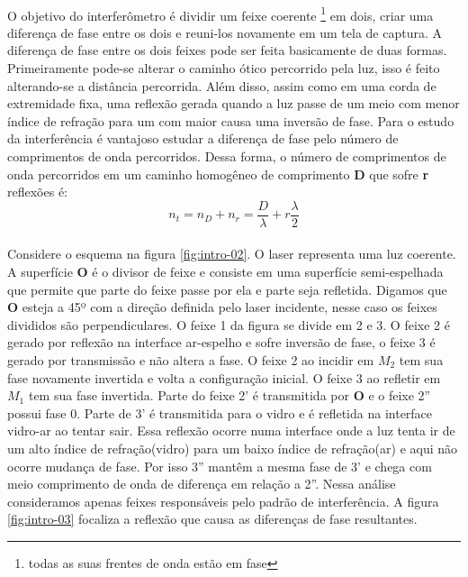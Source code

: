 \documentclass[a4paper,11pt]{article}
\begin{document}
\paragraph{}O objetivo do interferômetro é dividir um feixe coerente \footnote{todas as suas frentes de onda estão em fase} em dois, criar uma diferença de fase entre os dois e reuni-los novamente em um tela de captura. A diferença de fase entre os dois feixes pode ser feita basicamente de duas formas. Primeiramente pode-se alterar o caminho ótico percorrido pela luz, isso é feito alterando-se a distância percorrida. Além disso, assim como em uma corda de extremidade fixa, uma reflexão gerada quando a luz passe de um meio com menor índice de refração para um com maior causa uma inversão de fase. Para o estudo da interferência é vantajoso estudar a diferença de fase pelo número de comprimentos de onda percorridos. Dessa forma, o número de comprimentos de onda percorridos em um caminho homogêneo de comprimento \textbf{D} que sofre \textbf{r} reflexões é:
\begin{equation}
	n_t = n_D + n_r = \frac{D}{\lambda} +  r\frac{\lambda}{2}
\end{equation}
\paragraph{} Considere o esquema na figura \ref{fig:intro-02}. O laser representa uma luz coerente. A superfície \textbf{O} é o divisor de feixe e consiste em uma superfície semi-espelhada que permite que parte do feixe passe por ela e parte seja refletida. Digamos que \textbf{O} esteja a 45º com a direção definida pelo laser incidente, nesse caso os feixes divididos são perpendiculares. O feixe 1 da figura se divide em 2 e 3. O feixe 2 é gerado por reflexão na interface ar-espelho e sofre inversão de fase, o feixe 3 é gerado por transmissão e não altera a fase. O feixe 2 ao incidir em $M_2$ tem sua fase novamente invertida e volta a configuração inicial. O feixe 3 ao refletir em $M_1$ tem sua fase invertida. Parte do feixe 2' é transmitida por \textbf{O} e o feixe 2'' possui fase 0. Parte de 3' é transmitida para o vidro e é refletida na interface vidro-ar ao tentar sair. Essa reflexão ocorre numa interface onde a luz tenta ir de um alto índice de refração(vidro) para um baixo índice de refração(ar) e aqui não ocorre mudança de fase. Por isso 3'' mantêm a mesma fase de 3' e chega com meio comprimento de onda de diferença em relação a 2''. Nessa análise consideramos apenas feixes responsáveis pelo padrão de interferência. A figura \ref{fig:intro-03} focaliza a reflexão que causa as diferenças de fase resultantes. 
\end{document}
